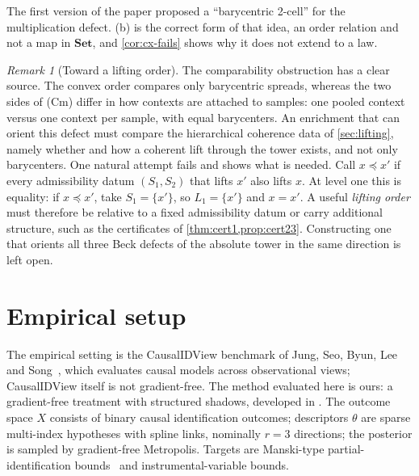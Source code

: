 \documentclass[11pt]{article}
\theoremstyle{definition}
\theoremstyle{remark}
\newtheorem{remark}[theorem]{Remark}
\newcommand{\Set}{\mathbf{Set}}
\begin{document}
The first version of the paper proposed a ``barycentric 2-cell'' for the multiplication defect.
(b) is the correct form of that idea, an order relation and not a map in $\Set$, and
\cref{cor:cx-fails} shows why it does not extend to a law.

\begin{remark}[Toward a lifting order]\label{rem:lift-order}
The comparability obstruction has a clear source. The convex order compares only barycentric
spreads, whereas the two sides of (Cm) differ in how contexts are attached to samples: one pooled
context versus one context per sample, with equal barycenters. An enrichment that can orient this
defect must compare the hierarchical coherence data of \cref{sec:lifting}, namely whether and how a
coherent lift through the tower exists, and not only barycenters. One natural attempt fails and shows
what is needed. Call $x\preceq x'$ if every admissibility datum $(S_1,S_2)$ that lifts $x'$ also lifts
$x$. At level one this is equality: if $x\preceq x'$, take $S_1=\{x'\}$, so $L_1=\{x'\}$ and $x=x'$. A
useful \emph{lifting order} must therefore be relative to a fixed admissibility datum or carry
additional structure, such as the certificates of \cref{thm:cert1,prop:cert23}. Constructing one that
orients all three Beck defects of the absolute tower in the same direction is left open.
\end{remark}

\section{Empirical setup}

The empirical setting is the CausalIDView benchmark of Jung, Seo, Byun, Lee and
Song~\cite{Jung2026}, which evaluates causal models across observational views; CausalIDView itself
is not gradient-free. The method evaluated here is ours: a gradient-free treatment with structured
shadows, developed in \cite[Section~51]{Awasthi-ThreeLayers}. The outcome space $X$ consists of binary causal
identification outcomes; descriptors $\theta$ are sparse multi-index hypotheses with spline links,
nominally $r=3$ directions; the posterior is sampled by gradient-free Metropolis. Targets are
Manski-type partial-identification bounds~\cite{Manski1990} and instrumental-variable bounds.
\end{document}
